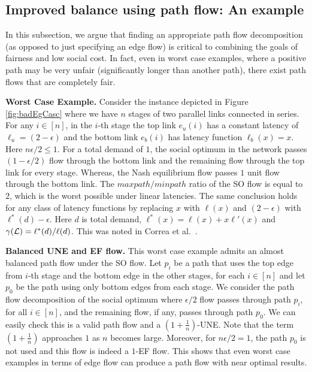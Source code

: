  
\subsection{Improved balance using path flow: An example}\label{sec:exampleBalncedNetwork} 
 In this subsection, we argue that finding an appropriate path flow decomposition (as opposed to just specifying an edge flow) is critical to combining the goals of fairness and low social cost.  In fact, even in worst case examples, where a positive path may be very unfair (significantly longer than another path), there exist path flows that are completely fair. 


\smallskip\noindent\textbf{Worst Case Example.} Consider the instance depicted in Figure \ref{fig:badEgCasc} where we have $n$ stages of two parallel links connected in series. For any $i\in [n]$, in the $i$-th stage the top link $e_u(i)$ has a constant latency of $\ell_u = (2-\epsilon)$ and the bottom link $e_b(i)$ has latency function $\ell_b(x) = x$.  Here  $n\epsilon/2 \leq 1$. For a total demand of $1$, the social optimum in the network passes $(1-\epsilon/2)$ flow through the bottom link and the remaining flow through the top link for every stage. Whereas, the Nash equilibrium flow passes $1$ unit flow through the bottom link. The  $maxpath/minpath$ ratio  of the SO flow is equal to $2$, which is the worst possible under linear latencies. The same conclusion holds for any class of latency functions by replacing $x$ with $\ell(x)$ and $(2-\epsilon)$ with $\ell^*(d)-\epsilon$. Here $d$ is total demand, $\ell^*(x)= \ell(x)+x\ell'(x)$ and $\gamma(\mathcal{L})= \ell^*(d)/\ell(d)$. This was noted in Correa et al.~\cite{correa2004computational}.   


\smallskip\noindent\textbf{Balanced UNE and EF flow.} This worst case example admits an almost balanced path flow under the SO flow.
Let $p_i$ be a path that uses the top edge from $i$-th stage and the bottom edge in the other stages, for each $i\in [n]$ and let $p_0$ be the path using only bottom edges from each stage. We consider the path flow decomposition of the social optimum where $\epsilon/2$ flow passes through path $p_i$,  for all $i\in [n]$, and the remaining flow, if any, passes through path $p_0$. We can easily check this is a valid path flow and  a 
$\left(1+ \frac{1}{n}\right)$-UNE. 
Note that the term $\left(1+ \frac{1}{n}\right)$ approaches $1$ as $n$ becomes 
large. Moreover, for $n\epsilon/2=1$, the path $p_0$ is not used and this flow is indeed a $1$-EF flow. This shows that even worst case examples in terms of edge flow can produce a path flow with near optimal results.


